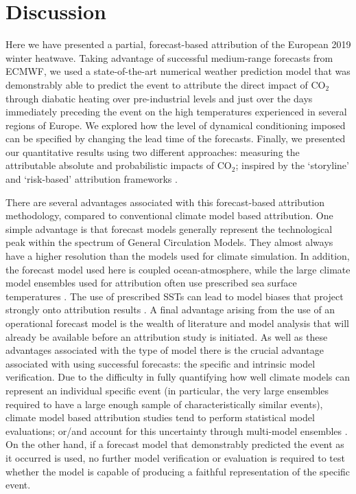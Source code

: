 \section{Discussion}\label{ch3:discussion}

  Here we have presented a partial, forecast-based attribution of the European 2019 winter heatwave. Taking advantage of successful medium-range forecasts from ECMWF, we used a state-of-the-art numerical weather prediction model that was demonstrably able to predict the event to attribute the direct impact of CO$_2$ through diabatic heating over pre-industrial levels and just over the days immediately preceding the event on the high temperatures experienced in several regions of Europe. We explored how the level of dynamical conditioning imposed can be specified by changing the lead time of the forecasts. Finally, we presented our quantitative results using two different approaches: measuring the attributable absolute and probabilistic impacts of CO$_2$; inspired by the `storyline' and `risk-based' attribution frameworks \citep{stott_human_2004,shepherd_common_2016,winsberg_severe_2020,jezequel_behind_2018}.  
  
  There are several advantages associated with this forecast-based attribution methodology, compared to conventional climate model based attribution. One simple advantage is that forecast models generally represent the technological peak within the spectrum of General Circulation Models. They almost always have a higher resolution than the models used for climate simulation. In addition, the forecast model used here is coupled ocean-atmosphere, while the large climate model ensembles used for attribution often use prescribed sea surface temperatures \citep{ciavarella_upgrade_2018}. The use of prescribed SSTs can lead to model biases that project strongly onto attribution results \citep{fischer_biased_2018}. A final advantage arising from the use of an operational forecast model is the wealth of literature and model analysis that will already be available before an attribution study is initiated. As well as these advantages associated with the type of model there is the crucial advantage associated with using successful forecasts: the specific and intrinsic model verification. Due to the difficulty in fully quantifying how well climate models can represent an individual specific event (in particular, the very large ensembles required to have a large enough sample of characteristically similar events), climate model based attribution studies tend to perform statistical model evaluations; or/and account for this uncertainty through multi-model ensembles \citep{philip_protocol_2020}. On the other hand, if a forecast model that demonstrably predicted the event as it occurred is used, no further model verification or evaluation is required to test whether the model is capable of producing a faithful representation of the specific event.
  
